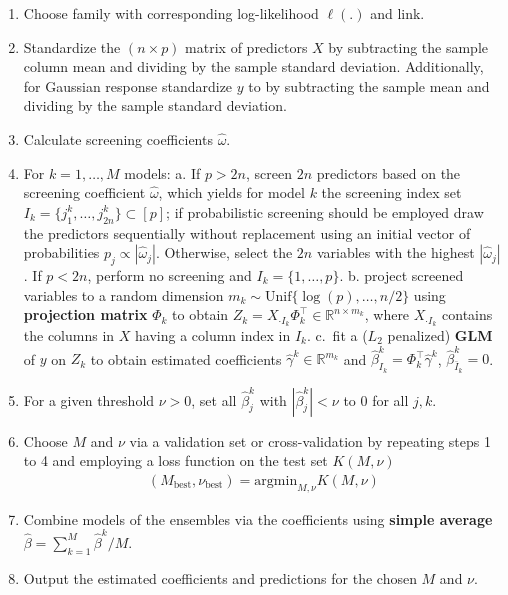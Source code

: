 \documentclass[
  article]{jss}
\begin{document}
\begin{enumerate}
\def\labelenumi{\arabic{enumi}.}
\item
  Choose family with corresponding log-likelihood \(\ell(.)\) and link.
\item
  Standardize the \((n\times p)\) matrix of predictors \(X\) by
  subtracting the sample column mean and dividing by the sample standard
  deviation. Additionally, for Gaussian response standardize \(y\) to by
  subtracting the sample mean and dividing by the sample standard
  deviation.
\item
  Calculate screening coefficients \(\hat\omega\).
\item
  For \(k=1,\dots,M\) models: a. If \(p>2n\), screen \(2n\) predictors
  based on the screening coefficient \(\hat\omega\), which yields for
  model \(k\) the screening index set
  \(I_k=\{j_1^k,\dots,j_{2n}^k\}\subset[p]\); if probabilistic screening
  should be employed draw the predictors sequentially without
  replacement using an initial vector of probabilities
  \(p_j\propto |\hat\omega_j|\). Otherwise, select the \(2n\) variables
  with the highest \(|\hat\omega_j|\). If \(p < 2n\), perform no
  screening and \(I_k=\{1,\dots,p\}\). b. project screened variables to
  a random dimension \(m_k\sim \text{Unif}\{\log(p),\dots,n/2\}\) using
  \textbf{projection matrix} \(\Phi_k\) to obtain
  \(Z_k=X_{\cdot I_k}\Phi_k^\top \in \mathbb{R}^{n\times m_k}\), where
  \(X_{\cdot I_k}\) contains the columns in \(X\) having a column index
  in \(I_k\). c.~fit a (\(L_2\) penalized) \textbf{GLM} of \(y\) on
  \(Z_k\) to obtain estimated coefficients
  \(\widehat\gamma^k\in\mathbb{R}^{m_k}\) and
  \(\hat \beta_{I_k}^k=\Phi_k^\top\widehat\gamma^k\),
  \(\hat \beta_{\bar I_k}^k=0\).
\item
  For a given threshold \(\nu>0\), set all \(\hat\beta_j^k\) with
  \(|\hat\beta_j^k|<\nu\) to \(0\) for all \(j,k\).
\item
  Choose \(M\) and \(\nu\) via a validation set or cross-validation by
  repeating steps 1 to 4 and employing a loss function on the test set
  \(K(M, \nu)\) \begin{align*}
      (M_{\text{best}},\nu_{\text{best}}) = \text{argmin}_{M,\nu}K(M,\nu)
    \end{align*}
\item
  Combine models of the ensembles via the coefficients using
  \textbf{simple average} \(\hat \beta = \sum_{k=1}^M\hat \beta^k / M\).
\item
  Output the estimated coefficients and predictions for the chosen \(M\)
  and \(\nu\).
\end{enumerate}
\end{document}
